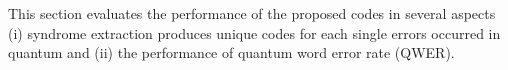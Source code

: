 \chapter{\babempat}
This section evaluates the performance of the proposed codes in several aspects (i) syndrome extraction produces unique codes for each single errors occurred in quantum and (ii) the performance of quantum word error rate (QWER). 